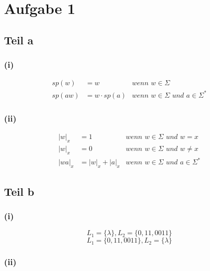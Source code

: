 \documentclass[10pt,a4paper]{article}
\begin{document}
\section{Aufgabe 1}

\subsection{Teil a}

\subsubsection{(i)}

\begin{align*}
  sp(w) & = w & \textit{wenn $w \in \Sigma$}\\
  sp(aw) & = w \cdot sp(a) & \textit{wenn $w \in \Sigma$ und $a \in \Sigma^{*}$}
\end{align*}

\subsubsection{(ii)}

\begin{align*}
  |w|_{x} & = 1 & \textit{wenn $w \in \Sigma$ und $w = x$}\\
  |w|_{x} & = 0 & \textit{wenn $w \in \Sigma$ und $w \ne x$}\\
  |wa|_{x} & = |w|_{x} + |a|_{x} & \textit{wenn $w \in \Sigma$ und $a \in \Sigma^{*}$}
\end{align*}

\subsection{Teil b}

\subsubsection{(i)}

\begin{equation}
  L_{1} = \{ \lambda \}, L_{2} = \{ 0, 11, 0011 \}
\end{equation}
\begin{equation}
  L_{1} = \{ 0, 11, 0011 \}, L_{2} = \{ \lambda \}
\end{equation}

\subsubsection{(ii)}
\end{document}
